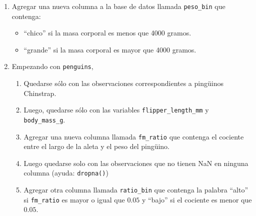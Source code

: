 \documentclass[a4paper,11pt]{article}
\theoremstyle{definition}
\begin{document}
\begin{enumerate}
\item Agregar una nueva columna a la base de datos llamada \lstinline{peso_bin} que contenga:
\begin{itemize}
\item ``chico'' si la masa corporal es menos que 4000 gramos.
\item ``grande'' si la masa corporal es mayor que 4000 gramos.
\end{itemize}

\item Empezando con \lstinline{penguins},

\begin{enumerate}
\item Quedarse sólo con las observaciones correspondientes a ping\"uinos Chinstrap.
\item Luego, quedarse sólo con las variables \lstinline{flipper_length_mm} y \lstinline{body_mass_g}.
\item Agregar una nueva columna llamada \lstinline{fm_ratio} que contenga el cociente entre el largo de la aleta y el peso del ping\"uino.
\item Luego quedarse solo con las observaciones que no tienen NaN en ninguna columna (ayuda: \lstinline{dropna()})
\item Agregar otra columna llamada \lstinline{ratio_bin} que contenga la palabra ``alto'' si \lstinline{fm_ratio} es mayor o igual que $0.05$ y ``bajo'' si el cociente es menor que $0.05$.
\end{enumerate}

\end{enumerate}
\end{document}

